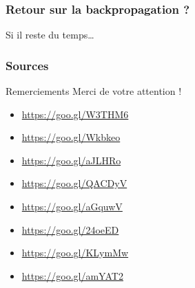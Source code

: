 \documentclass[]{beamer}
\begin{document}
\begin{frame}
  \frametitle{Retour sur la backpropagation ?}
  \vfill
  \alert{Si il reste du temps\ldots{}}
  \vfill
\end{frame}

\begin{frame}
  \frametitle{Sources}

  \begin{block}{Remerciements}
    Merci de votre attention !
  \end{block}

  \begin{itemize}
    \item \url{https://goo.gl/W3THM6}
    \item \url{https://goo.gl/Wkbkeo}
    \item \url{https://goo.gl/aJLHRo}
    \item \url{https://goo.gl/QACDyV}
    \item \url{https://goo.gl/aGquwV}
    \item \url{https://goo.gl/24oeED}
    \item \url{https://goo.gl/KLymMw}
    \item \url{https://goo.gl/amYAT2}
  \end{itemize}
\end{frame}
\end{document}
